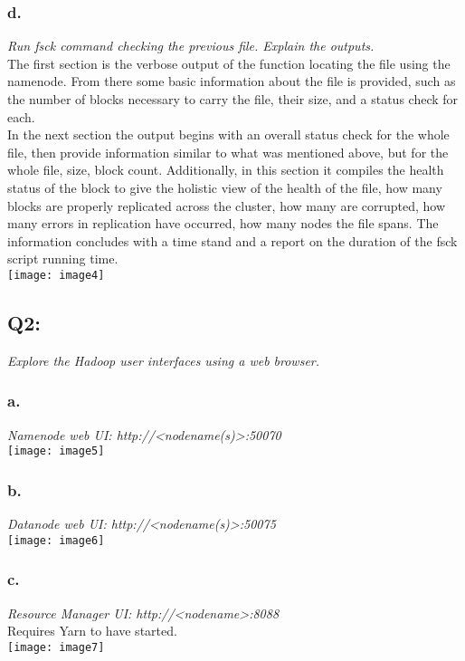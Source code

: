 \documentclass[]{article}
\begin{document}
\subsubsection*{d.}
\emph{Run fsck command checking the previous file. Explain the outputs.} \\
The first section is the verbose output of the function locating the file using the namenode. From there some basic information about the file is provided, such as the number of blocks necessary to carry the file, their size, and a status check for each.\\
In the next section the output begins with an overall status check for the whole file, then provide information similar to what was mentioned above, but for the whole file, size, block count. Additionally, in this section it compiles the health status of the block to give the holistic view of the health of the file, how many blocks are properly replicated across the cluster, how many are corrupted, how many errors in replication have occurred, how many nodes the file spans. The information concludes with a time stand and a report on the duration of the fsck script running time. \\
\texttt{[image: image4]} \vspace{-1.5em}

\subsection*{Q2:}
\emph{Explore the Hadoop user interfaces using a web browser.} \\

\subsubsection*{a.}
\emph{Namenode web UI: http://<nodename(s)>:50070} \\
\texttt{[image: image5]} \vspace{-1.5em}

\subsubsection*{b.}
\emph{Datanode web UI: http://<nodename(s)>:50075} \\
\texttt{[image: image6]} \vspace{-1.5em}

\subsubsection*{c.}
\emph{Resource Manager UI: http://<nodename>:8088} \\
Requires Yarn to have started. \\
\texttt{[image: image7]} \vspace{-1.5em}
\end{document}
